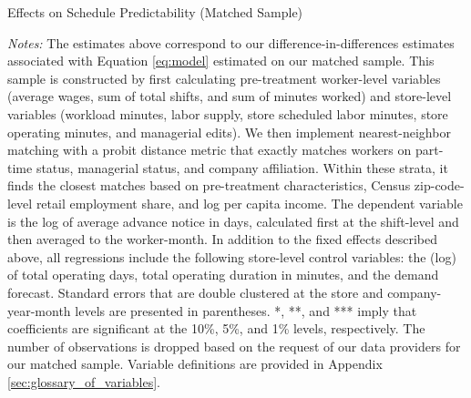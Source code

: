 \documentclass[letterpaper,11pt,leqno]{article}
\theoremstyle{paper}
\newcommand{\note}[2][]{\parbox{\textwidth}{\footnotesize\vspace*{10pt}\textit{#1}#2}}
\begin{document}
\begin{singlespace}
\begin{table}[H]
\caption{Effects on Schedule Predictability (Matched Sample)}

\note{\scriptsize\textit{Notes: }The estimates above correspond to our difference-in-differences estimates associated with Equation \ref{eq:model} estimated on our matched sample. This sample is constructed by first calculating pre-treatment worker-level variables (average wages, sum of total shifts, and sum of minutes worked) and store-level variables (workload minutes, labor supply, store scheduled labor minutes, store operating minutes, and managerial edits). We then implement nearest-neighbor matching with a probit distance metric that exactly matches workers on part-time status, managerial status, and company affiliation. Within these strata, it finds the closest matches based on pre-treatment characteristics, Census zip-code-level retail employment share, and log per capita income. The dependent variable is the log of average advance notice in days, calculated first at the shift-level and then averaged to the worker-month. In addition to the fixed effects described above, all regressions include the following store-level control variables: the (log) of total operating days, total operating duration in minutes, and the demand forecast. Standard errors that are double clustered at the store and company-year-month levels are presented in parentheses. *, **, and *** imply that coefficients are significant at the 10\%, 5\%, and 1\% levels, respectively. The number of observations is dropped based on the request of our data providers for our matched sample. Variable definitions are provided in Appendix \ref{sec:glossary_of_variables}.}
\label{table:adv_notice_matched}
\end{table}
\end{singlespace}
\end{document}
